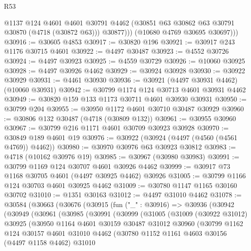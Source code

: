 \begin{lexlean}{R53}
\begin{coremodule}
              @1137
              @124
              @4601
              @4601
              @30791
              @4462
              (@30851 @63 @30862 @63 @30791 @30870 (@4718 (@30872 @63)))
              @30877)))
        (@10680 @4769 @30695 @30697)))
@30916 := @30605 @4853
@30917 := @30820 @196
@30921 := @30917 @243 @1176 @30715 @4601
@30922 := @4497 @30487
@30923 := @4552 @30726
@30924 := @4497 @30923
@30925 := @4559 @30729
@30926 := @10060 @30925
@30928 := @4497 @30926 @4462
@30929 := @30924 @30928
@30930 := @30922 @30929
@30931 := @4461 @30930
@30936 := @30921 (@4497 @30931 @4462) (@10060 @30931)
@30942 := @30799 @1174 @124 @30713 @4601 @30931 @4462
@30949 := @30820 @159 @133 @1173 @30711 @4601 @30930 @30931
@30950 := @30799 @204
@30955 := @30950 @1172 @4601 @30710 @30487 @30929
@30960 := @30806 @132 @30487 (@4718 (@30809 @132))
@30961 := @30955 @30960
@30967 := @30799 @216 @1171 @4601 @30709 @30923 @30928
@30970 := @30849 @189 @4601 @19
@30976 := @30922 (@30924 (@4497 (@4560 (@4561 @4769)) @4462))
@30980 := @30970 @30976 @63 @30923 @30812
@30983 := @4718 (@10162 @30976 @19)
@30985 := @30967 (@30980 @30983)
@30991 := @30799 @1169 @124 @30707 @4601 @30926 @4462
@30999 := @30917 @73 @1168 @30705 @4601 (@4497 @30925 @4462) @30926
@31005 := @30799 @1166 @124 @30703 @4601 @30925 @4462
@31009 := @30780 @1147 @1165 @30160 @30702
@31010 := @1351 @30163
@31012 := @4497 @31010 @4462
@31078 := @30584
    (@30663
      (@30676
        (@30915
          (fun ("_" : @30916) =>
          @30936
            (@30942
              (@30949
                (@30961
                  (@30985
                    (@30991
                      (@30999
                        (@31005
                          (@31009
                            (@30922 @31012)
                            @30925
                            (@30950
                              @1164
                              @4601
                              @30159
                              @30487
                              @31012
                              @30960
                              (@30799
                                @1162
                                @124
                                @30157
                                @4601
                                @31010
                                @4462
                                (@30780
                                  @1152
                                  @1161
                                  @4603
                                  @30156
                                  (@4497 @1158 @4462)
                                  @31010

\end{coremodule}
\end{lexlean}
